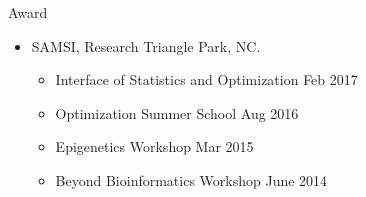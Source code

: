 \documentclass{resume} %
\begin{document}
\begin{rSection}{Award}
\begin{itemize}[noitemsep,topsep=0pt]
\item SAMSI, Research Triangle Park, NC.	
\begin{itemize}[noitemsep,topsep=0pt]
\item {Interface of Statistics and Optimization} \hfill Feb 2017
\item {Optimization Summer School} \hfill Aug 2016
\item {Epigenetics Workshop} \hfill Mar 2015
\item {Beyond Bioinformatics Workshop} \hfill June 2014
\end{itemize}

\end{itemize}

\end{rSection}

\end{document}
